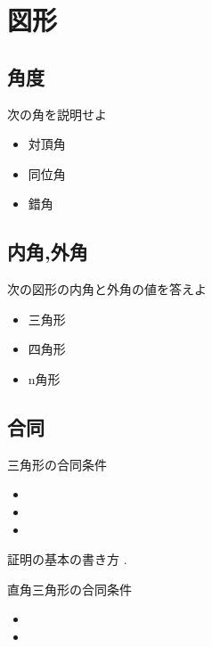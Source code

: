 \documentclass[10pt]{jsarticle}
\begin{document}
\section{図形}
\subsection{角度}
\begin{itembox}[l]{次の角を説明せよ}
	\begin{itemize}
		\item  対頂角
		\item 同位角
		\item 錯角
	\end{itemize}
\end{itembox}

\subsection{内角,外角}
\begin{itembox}[l]{次の図形の内角と外角の値を答えよ}
	\begin{itemize}
		\item  三角形
		\item 四角形
		\item n角形
	\end{itemize}
\end{itembox}

\subsection{合同}
\begin{itembox}[l]{三角形の合同条件}
	\begin{Large}
		\begin{itemize}
			\item
			\item
			\item
		\end{itemize}
	\end{Large}
\end{itembox}

\begin{itembox}[l]{証明の基本の書き方}
	. \\[70mm]
\end{itembox}


\begin{itembox}[l]{直角三角形の合同条件}
	\begin{Large}
		\begin{itemize}
			\item
			\item
		\end{itemize}
	\end{Large}
\end{itembox}
\end{document}

